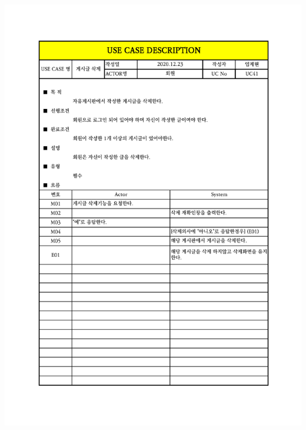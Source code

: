 {{{{{{{{{{{{{{{{{{{{{{{{{{{{{{{{{{{{{{{{{{{{\includegraphics[width=1.1\textwidth]{./Figure/Design/Display/usecase/041.pdf} \\
}}}}}}}}}}}}}}}}}}}}}}}}}}}}}}}}}}}}}}}}}}}}

